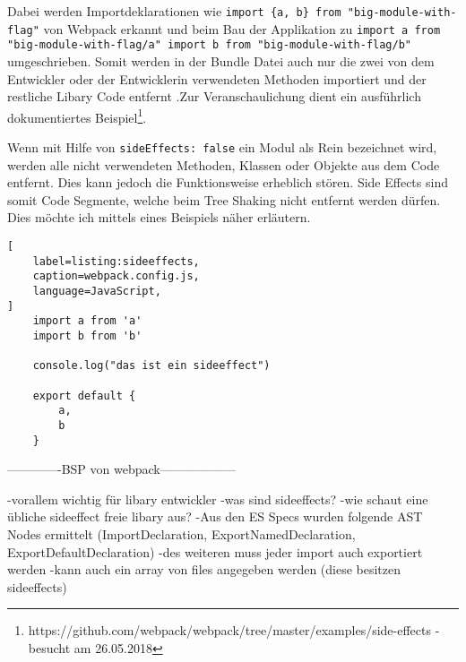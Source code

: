 Dabei werden Importdeklarationen wie \lstinline|import {a, b} from "big-module-with-flag"| von Webpack erkannt und beim Bau der Applikation zu \lstinline|import a from "big-module-with-flag/a" import b from "big-module-with-flag/b"| umgeschrieben. Somit werden in der Bundle Datei auch nur die zwei von dem Entwickler oder der Entwicklerin verwendeten Methoden importiert und der restliche Libary Code entfernt \autocite{WebpackTreeShaking}.Zur Veranschaulichung dient ein ausführlich dokumentiertes Beispiel\footnote{https://github.com/webpack/webpack/tree/master/examples/side-effects - besucht am 26.05.2018}. 

Wenn mit Hilfe von \lstinline{sideEffects: false} ein Modul als Rein bezeichnet wird, werden alle nicht verwendeten Methoden, Klassen oder Objekte aus dem Code entfernt. Dies kann jedoch die Funktionsweise erheblich stören. Side Effects sind somit Code Segmente, welche beim Tree Shaking nicht entfernt werden dürfen. Dies möchte ich mittels eines Beispiels näher erläutern.

\begin{lstlisting}[
    label=listing:sideeffects,
	caption=webpack.config.js,
	language=JavaScript,
]
	import a from 'a'
    import b from 'b'
    
    console.log("das ist ein sideeffect")
    
    export default {
    	a,
        b
    }
\end{lstlisting}





-------------BSP von webpack------------------

-vorallem wichtig für libary entwickler
-was sind sideeffects?
-wie schaut eine übliche sideeffect freie libary aus?
-Aus den ES Specs wurden folgende AST Nodes ermittelt (ImportDeclaration, ExportNamedDeclaration, ExportDefaultDeclaration)
-des weiteren muss jeder import auch exportiert werden
-kann auch ein array von files angegeben werden (diese besitzen sideeffects)

\autocite{TamasSallai}

